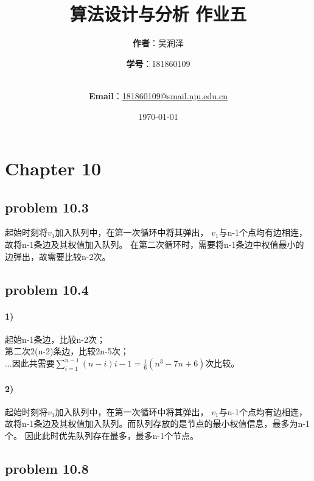 \documentclass[11pt,a4paper,oneside,oldfontcommands]{ctexart}
\title{\Huge\textbf{算法设计与分析 作业五}\\}
\author{\Large\textbf{作者}：吴润泽 \and{\Large\textbf{学号}：181860109}\\
	\\
	\and {\Large\textbf{Email}：\href{mailto:181860109@smail.nju.edu.cn}{181860109@smail.nju.edu.cn}}\\}
\date{\Large\today}
\begin{document}
\maketitle
\newpage
\tableofcontents
\cleardoublepage
\section*{Chapter 10}
{\subsection*{problem 10.3}}
起始时刻将$v_1$加入队列中，在第一次循环中将其弹出，
$v_1$与n-1个点均有边相连，故将n-1条边及其权值加入队列。
在第二次循环时，需要将n-1条边中权值最小的边弹出，故需要比较n-2次。
{\subsection*{problem 10.4}}
\paragraph*{1)}
起始n-1条边，比较n-2次；\\
第二次2(n-2)条边，比较2n-5次；\\
...因此共需要$\sum\limits_{i=1}^{n-1}(n-i)i-1=\frac{1}{6}(n^3-7n+6)$次比较。
\paragraph*{2)}
起始时刻将$v_1$加入队列中，在第一次循环中将其弹出，
$v_1$与n-1个点均有边相连，故将n-1条边及其权值加入队列。而队列存放的是节点的最小权值信息，最多为n-1个。
因此此时优先队列存在最多，最多n-1个节点。
{\subsection*{problem 10.8}}
\end{document}
